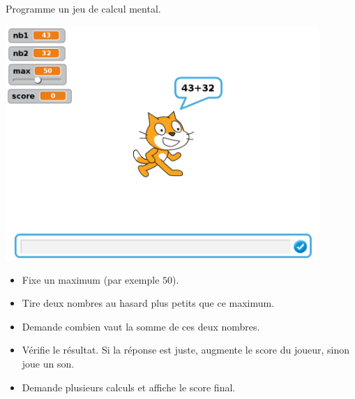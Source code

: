 \documentclass[class=report,crop=false, 12pt]{standalone}
\begin{document}
\begin{activite}

Programme un jeu de calcul mental.

\begin{center}
  \includegraphics[width=0.89\textwidth]{ecran-07-ex3} 
\end{center}

\begin{itemize}
  \item Fixe un maximum (par exemple $50$).
  \item Tire deux nombres au hasard plus petits que ce maximum.
  \item Demande combien vaut la somme de ces deux nombres.
  \item Vérifie le résultat. Si la réponse est juste, augmente le score du joueur, sinon joue un son.
  \item Demande plusieurs calculs et affiche le score final.
\end{itemize}

\end{activite}
\end{document}
